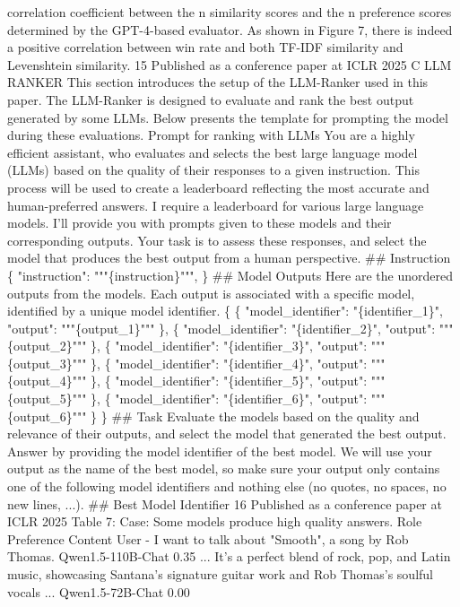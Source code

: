 correlation coefficient between the n similarity scores and the n preference scores determined by the
GPT-4-based evaluator. As shown in Figure 7, there is indeed a positive correlation between win rate
and both TF-IDF similarity and Levenshtein similarity.
15
Published as a conference paper at ICLR 2025
C
LLM RANKER
This section introduces the setup of the LLM-Ranker used in this paper. The LLM-Ranker is designed
to evaluate and rank the best output generated by some LLMs. Below presents the template for
prompting the model during these evaluations.
Prompt for ranking with LLMs
You are a highly efficient assistant, who evaluates and selects the best large language model
(LLMs) based on the quality of their responses to a given instruction. This process will be
used to create a leaderboard reflecting the most accurate and human-preferred answers.
I require a leaderboard for various large language models. I’ll provide you with prompts
given to these models and their corresponding outputs. Your task is to assess these responses,
and select the model that produces the best output from a human perspective.
\#\# Instruction
\{
"instruction": """\{instruction\}""",
\}
\#\# Model Outputs
Here are the unordered outputs from the models. Each output is associated with a specific
model, identified by a unique model identifier.
\{
\{
"model\_identifier": "\{identifier\_1\}",
"output": """\{output\_1\}"""
\},
\{
"model\_identifier": "\{identifier\_2\}",
"output": """\{output\_2\}"""
\},
\{
"model\_identifier": "\{identifier\_3\}",
"output": """\{output\_3\}"""
\},
\{
"model\_identifier": "\{identifier\_4\}",
"output": """\{output\_4\}"""
\},
\{
"model\_identifier": "\{identifier\_5\}",
"output": """\{output\_5\}"""
\},
\{
"model\_identifier": "\{identifier\_6\}",
"output": """\{output\_6\}"""
\}
\}
\#\# Task
Evaluate the models based on the quality and relevance of their outputs, and select the model
that generated the best output. Answer by providing the model identifier of the best model.
We will use your output as the name of the best model, so make sure your output only contains
one of the following model identifiers and nothing else (no quotes, no spaces, no new lines, ...).
\#\# Best Model Identifier
16
Published as a conference paper at ICLR 2025
Table 7: Case: Some models produce high quality answers.
Role
Preference
Content
User
-
I want to talk about "Smooth", a song by Rob Thomas.
Qwen1.5-110B-Chat
0.35
... It’s a perfect blend of rock, pop, and Latin music, showcasing
Santana’s signature guitar work and Rob Thomas’s soulful vocals ...
Qwen1.5-72B-Chat
0.00
